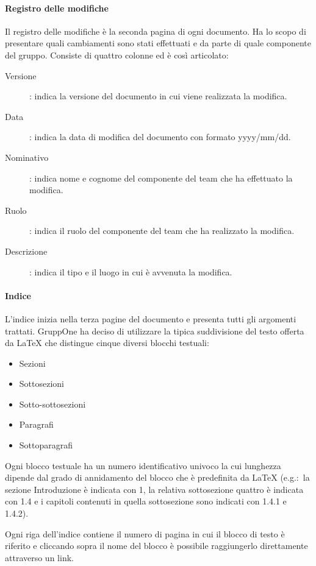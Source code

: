 \documentclass[../norme-di-progetto.tex]{subfiles}
\begin{document}
\paragraph{Registro delle modifiche}%
\label{par:registro_delle_modifiche}
Il registro delle modifiche è la seconda pagina di ogni documento. Ha lo scopo di presentare quali cambiamenti sono stati effettuati e da parte di quale componente del gruppo. Consiste di quattro colonne ed è così articolato:
\begin{description}
  \item [Versione]: indica la versione del documento in cui viene realizzata la modifica.
  \item [Data]: indica la data di modifica del documento con formato yyyy/mm/dd.
  \item [Nominativo]: indica nome e cognome del componente del team che ha effettuato la modifica.
  \item [Ruolo]: indica il ruolo del componente del team che ha realizzato la modifica.
  \item [Descrizione]: indica il tipo e il luogo in cui è avvenuta la modifica.
\end{description}

\paragraph{Indice}%
\label{par:indice}
L'indice inizia nella terza pagine del documento e presenta tutti gli argomenti trattati.
GruppOne ha deciso di utilizzare la tipica suddivisione del testo offerta da \LaTeX{} che distingue cinque diversi blocchi testuali:

\begin{itemize}
  \item Sezioni
  \item Sottosezioni
  \item Sotto-sottosezioni
  \item Paragrafi
  \item Sottoparagrafi
\end{itemize}

Ogni blocco testuale ha un numero identificativo univoco la cui lunghezza dipende dal grado di annidamento del blocco che è predefinita da \LaTeX{} (e.g.:\ la sezione Introduzione è indicata con 1, la relativa sottosezione quattro è indicata con 1.4 e i capitoli contenuti in quella sottosezione sono indicati con 1.4.1 e 1.4.2).

Ogni riga dell'indice contiene il numero di pagina in cui il blocco di testo è riferito e cliccando sopra il nome del blocco è possibile raggiungerlo direttamente attraverso un link.
\end{document}
